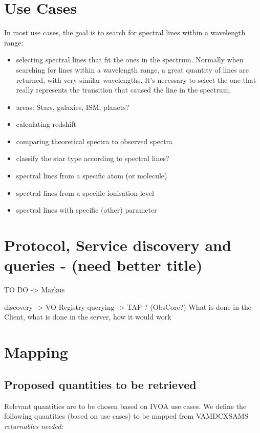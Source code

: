 \documentclass[11pt,a4paper]{ivoa}
\begin{document}
\section{Use Cases}

In most use cases, the goal is to search for spectral lines within a wavelength range:

\begin{itemize}

\item selecting  spectral lines that fit the ones in the spectrum.
Normally when searching for lines within a wavelength range, a great quantity of lines are returned, with very similar wavelengths. It's necessary to select the one that really represents the transition that caused the line in the spectrum.
\item areas: Stars, galaxies, ISM, planets?
\item calculating redshift
\item comparing theoretical spectra to observed spectra
\item classify the star type according to spectral lines?
\item spectral lines from a specific atom (or molecule)
\item spectral lines from a specific ionisation level
\item spectral lines with specific (other) parameter

\end{itemize}

\section{Protocol, Service discovery and queries - (need better title)}
TO DO -> Markus

discovery -> VO Registry
querying ->  TAP ? (ObsCore?)
What is done in the Client, what is done in the server, how it would work


\section{Mapping}



\subsection{Proposed quantities to be retrieved}\label{quantities}

Relevant quantities are to be chosen based on IVOA use cases. We define the following quantities (based on use cases) to be mapped from VAMDCXSAMS \textit{returnables needed:}
\end{document}
